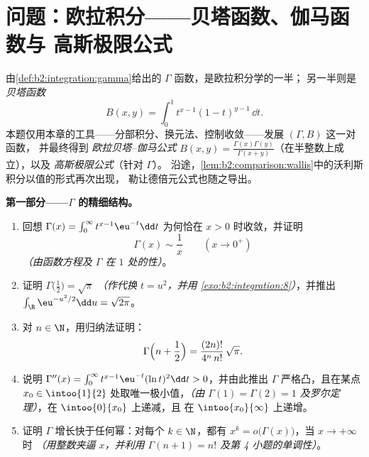 \section{问题：欧拉积分——贝塔函数、伽马函数与
高斯极限公式}

\begin{problem}\label{pb:b2:integration:1}
由\cref{def:b2:integration:gamma}给出的 $\Gamma$ 函数，是欧拉积分学的一半；
另一半则是
\emph{贝塔函数}
\[
B(x, y) = \int_0^1 t^{x-1}(1 - t)^{y-1}\,\dd t .
\]
本题仅用本章的工具——分部积分、换元法、控制收敛——发展 $(\Gamma, B)$ 这一对函数，
并最终得到
\emph{欧拉贝塔–伽马公式}
$B(x,y) = \frac{\Gamma(x)\Gamma(y)}
{\Gamma(x+y)}$（在半整数上成立），以及
\emph{高斯极限公式}（针对 $\Gamma$）。
沿途，\cref{lem:b2:comparison:wallis}中的沃利斯积分以值的形式再次出现，
勒让德倍元公式也随之导出。

\medskip
\noindent\textbf{第一部分——$\Gamma$ 的精细结构。}
\begin{enumerate}
  \item 回想 $\Gamma(x) = \int_0^\infty t^{x-1}\eu^{-t}\dd
        t$ 为何恰在 $x > 0$ 时收敛，并证明
        \[
        \Gamma(x) \sim \frac1x \qquad (x \to 0^+)
        \]
        \emph{（由函数方程及 $\Gamma$ 在
        $1$ 处的性）}。
  \item 证明 $\Gamma\bigl(\tfrac12\bigr) = \sqrt\pi$
        \emph{（作代换 $t = u^2$，并用
        \cref{exo:b2:integration:8}）}，并推出
        $\int_\R \eu^{-u^2/2}\dd u = \sqrt{2\pi}$。
  \item 对 $n \in \N$，用归纳法证明：
        \[
        \Gamma\Bigl(n + \frac12\Bigr)
        = \frac{(2n)!}{4^n\,n!}\,\sqrt\pi .
        \]
  \item 说明 $\Gamma''(x) = \int_0^\infty
        t^{x-1}\eu^{-t}(\ln t)^2\dd t > 0$，并由此推出
        $\Gamma$ 严格凸，且在某点
        $x_0 \in \intoo{1}{2}$ 处取唯一极小值，\emph{（由 $\Gamma(1) = \Gamma(2)
        = 1$ 及罗尔定理）}，在 $\intoo{0}{x_0}$ 上递减，且
        在 $\intoo{x_0}{\infty}$ 上递增。
  \item 证明 $\Gamma$ 增长快于任何幂：对每个 $k \in
        \N$，都有 $x^k = o\bigl(\Gamma(x)\bigr)$，当 $x \to +\infty$ 时
        \emph{（用整数夹逼 $x$，并利用 $\Gamma(n+1)
        = n!$ 及第 4 小题的单调性）}。
\end{enumerate}


\end{problem}
